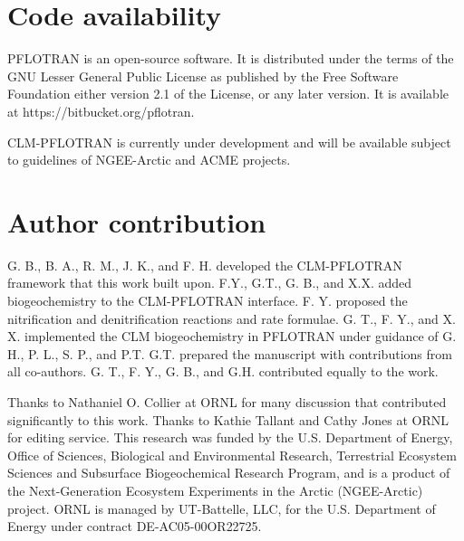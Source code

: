 \documentclass[gmd, manuscript]{copernicus}
\begin{document}


%
\section{Code availability}
PFLOTRAN is an open-source software. It is distributed under the terms of the
GNU Lesser General Public License as published by the Free Software Foundation
either version 2.1 of the License, or any later version. It is available at
https://bitbucket.org/pflotran. 

CLM-PFLOTRAN is currently under development and will be available subject to guidelines of NGEE-Arctic and ACME projects.

\section{Author contribution}
G. B., B. A., R. M., J. K., and F. H. developed the CLM-PFLOTRAN framework that this
work built upon. F.Y., G.T., G. B., and X.X. added biogeochemistry to the CLM-PFLOTRAN
interface. F. Y. proposed the nitrification and denitrification reactions and
rate formulae. G. T., F. Y., and X. X. implemented the CLM
biogeochemistry in PFLOTRAN under guidance of G. H., P. L., S. P., and P.T.
G.T. prepared the manuscript with contributions from all co-authors. 
G. T., F. Y., G. B., and G.H. contributed equally to the work.  

\begin{acknowledgements}
Thanks to Nathaniel O. Collier at ORNL for many discussion that contributed significantly to this work.
Thanks to Kathie Tallant and Cathy Jones at ORNL for editing service. This research was funded by the U.S. Department of Energy, Office of Sciences,
Biological and Environmental Research, Terrestrial Ecosystem Sciences and
Subsurface Biogeochemical Research Program, and is a product of the
Next-Generation Ecosystem Experiments in the Arctic (NGEE-Arctic) project.
ORNL is managed by UT-Battelle, LLC, for the U.S. Department of Energy under
contract DE-AC05-00OR22725.
\end{acknowledgements}
\end{document}
